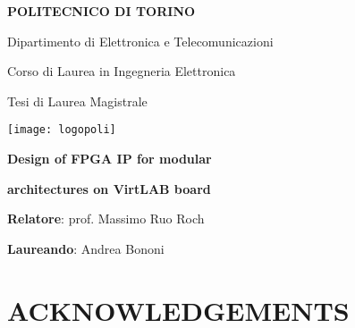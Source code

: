 \documentclass[10pt, english, a4paper, titlepage, oneside]{book}
\begin{document}
 

\begin{titlepage}
    \centerline{ \Huge\bf POLITECNICO DI TORINO }
    \vspace{2cm}
    \centerline{ \large Dipartimento di Elettronica e Telecomunicazioni } 
    \vspace{5mm}
    \centerline{ \large Corso di Laurea in Ingegneria Elettronica }
    \vspace{5mm}
    \centerline{ \large Tesi di Laurea Magistrale }
    \vspace{3cm}
    \centerline{ \texttt{[image: logopoli]} }
    \vspace{3cm}
    \centerline{ \Huge\bf Design of FPGA IP for modular }
    \vspace{5mm}
    \centerline{ \Huge\bf architectures on VirtLAB board }
    \vspace{4cm}
    \centerline{ \large \textbf{Relatore}: prof. Massimo Ruo Roch }
    \vspace{5mm}
    \centerline{ \large \textbf{Laureando}: Andrea Bononi }
\end{titlepage}

\chapter*{ACKNOWLEDGEMENTS}

\tableofcontents

\printglossary[type=\acronymtype, nonumberlist]

\end{document}
